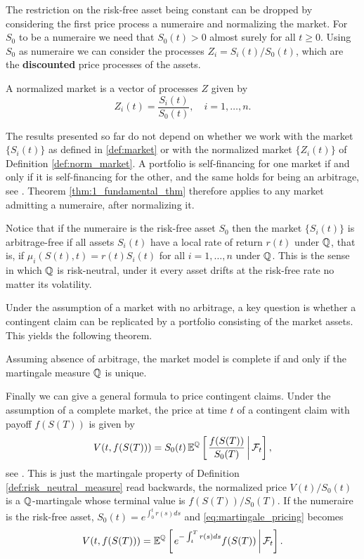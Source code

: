 The restriction on the risk-free asset being constant can be dropped by considering the first price process a numeraire and normalizing the market.
For $S_0$ to be a numeraire we need that $S_0(t) > 0$ almost surely for all $t \geq 0$.
Using $S_0$ as numeraire we can consider the processes $Z_i = S_i(t) / S_0(t)$,
which are the \textbf{discounted} price processes of the assets.
\begin{definition}\label{def:norm_market}
    A normalized market is a vector of  processes $Z$ given by
    \begin{equation*}
        Z_i(t) = \frac{S_i(t)}{S_0(t)}, \quad i = 1, \ldots, n.
    \end{equation*}
\end{definition}

The results presented so far do not depend on whether we work with the market $\{ S_i(t) \}$ as defined in \ref{def:market} or with the normalized market $\{ Z_i(t) \}$ of Definition \ref{def:norm_market}.
A portfolio is self-financing for one market if and only if it is self-financing for the other,
and the same holds for being an arbitrage,
see \cite[Ch.~10]{bjork_arbitrage}.
Theorem \ref{thm:1_fundamental_thm} therefore applies to any market admitting a numeraire, after normalizing it.

Notice that if the numeraire is the risk-free asset $S_0$ then the market $\{ S_i(t) \}$ is arbitrage-free if all assets $S_i(t)$ have a local rate of return $r(t)$ under $\mathbb{Q}$,
that is, if $\mu_i(S(t), t) = r(t) S_i(t)$ for all $i = 1, \ldots, n$ under $\mathbb{Q}$.
This is the sense in which $\mathbb{Q}$ is risk-neutral,
under it every asset drifts at the risk-free rate no matter its volatility.

Under the assumption of a market with no arbitrage,
a key question is whether a contingent claim can be replicated by a portfolio consisting of the market assets.
This yields the following theorem.
\begin{theorem}\label{thm:2_fundamental_thm}
   Assuming absence of arbitrage,
   the market model is complete if and only if the martingale measure $\mathbb{Q}$ is unique.
\end{theorem}

Finally we can give a general formula to price contingent claims.
Under the assumption of a complete market,
the price at time $t$ of a contingent claim with payoff $f(S(T))$ is given by
\begin{equation}\label{eq:martingale_pricing}
    V(t, f(S(T))) = S_0(t)\, \mathbb{E}^{\mathbb{Q}} \left[ \left. \frac{f(S(T))}{S_0(T)} \,\right| \mathcal{F}_t \right],
\end{equation}
see \cite[Ch.~10]{bjork_arbitrage}.
This is just the martingale property of Definition \ref{def:risk_neutral_measure} read backwards,
the normalized price $V(t) / S_0(t)$ is a $\mathbb{Q}$-martingale whose terminal value is $f(S(T)) / S_0(T)$.
If the numeraire is the risk-free asset, $S_0(t) = e^{\int_0^t r(s) ds}$ and \eqref{eq:martingale_pricing} becomes
\begin{equation*}
    V(t, f(S(T))) = \mathbb{E}^{\mathbb{Q}} \left[ \left. e^{ - \int^T_t r(s) ds} f(S(T)) \,\right| \mathcal{F}_t \right].
\end{equation*}
